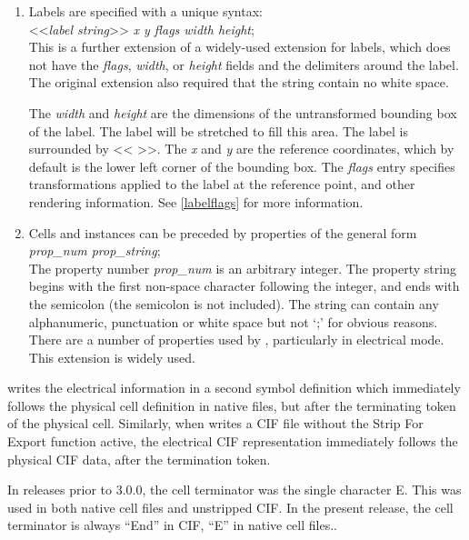 \begin{enumerate}
\item Labels are specified with a unique syntax:\\
{ <<{\it label string\/}>> {\it x y flags width height\/};}\\
This is a further extension of a widely-used extension for labels,
which does not have the {\it flags}, {\it width}, or {\it height}
fields and the delimiters around the label.  The original extension
also required that the string contain no white space.

The {\it width\/} and {\it height\/} are the dimensions of the
untransformed bounding box of the label.  The label will be stretched
to fill this area.  The label is surrounded by {\vt << >>}.  The {\it
x\/} and {\it y\/} are the reference coordinates, which by default is
the lower left corner of the bounding box.  The {\it flags\/} entry
specifies transformations applied to the label at the reference point,
and other rendering information.  See \ref{labelflags} for more
information.

\item Cells and instances can be preceded by properties of the general
form\\
{ {\it prop\_num prop\_string\/};}\\
The property number {\it prop\_num} is an arbitrary integer.  The
property string begins with the first non-space character following
the integer, and ends with the semicolon (the semicolon is not
included).  The string can contain any alphanumeric, punctuation or
white space but not `;' for obvious reasons.  There are a number of
properties used by {\Xic}, particularly in electrical mode.  This
extension is widely used.
\end{enumerate}

{\Xic} writes the electrical information in a second symbol definition
which immediately follows the physical cell definition in native
files, but after the terminating token of the physical cell.
Similarly, when {\Xic} writes a CIF file without the {\cb Strip For
Export} function active, the electrical CIF representation immediately
follows the physical CIF data, after the termination token. 

In {\Xic} releases prior to 3.0.0, the cell terminator was the single
character {\vt E}.  This was used in both native cell files and
unstripped CIF.  In the present release, the cell terminator is always
``{\vt End}'' in CIF, ``{\vt E}'' in native cell files..

